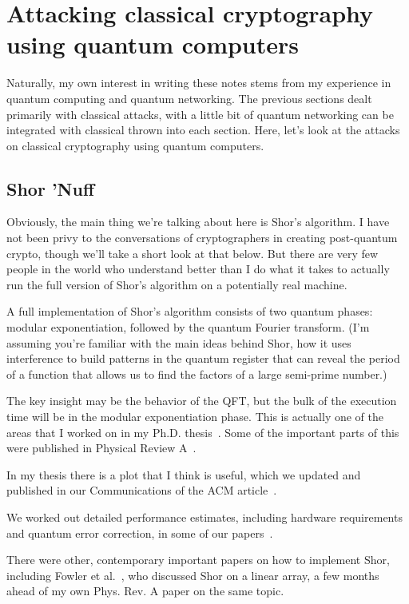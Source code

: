 \section{Attacking classical cryptography using quantum computers}

Naturally, my own interest in writing these notes stems from my
experience in quantum computing and quantum networking.  The previous
sections dealt primarily with classical attacks, with a little bit of
quantum networking can be integrated with classical thrown into each
section.  Here, let's look at the attacks on classical cryptography
using quantum computers.

\subsection{Shor 'Nuff}

Obviously, the main thing we're talking about here is Shor's
algorithm.  I have not been privy to the conversations of
cryptographers in creating post-quantum crypto, though we'll take a
short look at that below.  But there are very few people in the world
who understand better than I do what it takes to actually run the full
version of Shor's algorithm on a potentially real machine.

A full implementation of Shor's algorithm consists of two quantum
phases: modular exponentiation, followed by the quantum Fourier
transform.  (I'm assuming you're familiar with the main ideas behind
Shor, how it uses interference to build patterns in the quantum
register that can reveal the period of a function that allows us to
find the factors of a large semi-prime number.)

The key insight may be the behavior of the QFT, but the bulk of the
execution time will be in the modular exponentiation phase.  This is
actually one of the areas that I worked on in my
Ph.D. thesis~\cite{van-meter06:thesis}.  Some of the important parts
of this were published in Physical Review
A~\cite{van-meter04:fast-modexp}.

In my thesis there is a plot that I think is useful, which we updated
and published in our Communications of the ACM article~\cite{van-meter13:_blueprint}.

We worked out detailed performance estimates, including hardware
requirements and quantum error correction, in some of our papers~\cite{van-meter10:dist_arch_ijqi,PhysRevX.2.031007}.

There were other, contemporary important papers on how to implement
Shor, including Fowler et al.~\cite{fowler04:_shor_implem},
who discussed Shor on a linear array, a few months ahead of my own
Phys. Rev. A paper on the same topic.

